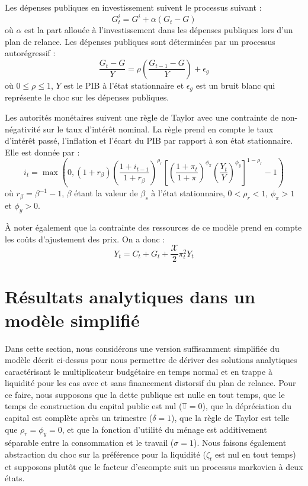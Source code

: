 \documentclass[12pt,letterpaper]{article}
\newcommand{\T}{\mathbb{T}}
\newcommand{\XX}{\mathcal{X}}
\begin{document}
Les dépenses publiques en investissement suivent le processus suivant :
\begin{equation}
G^i_t = G^i + \alpha(G_t - G) \tag{20}
\end{equation}
où $\alpha$ est la part allouée à l’investissement dans les dépenses publiques lors d’un plan de relance. Les dépenses publiques sont déterminées par un processus autorégressif :
\begin{equation}
\frac{G_t - G}{Y} = \rho\left(\frac{G_{t-1} - G}{Y}\right) + \epsilon_g \tag{21}
\end{equation}
où $0 \leq \rho \leq 1$, $Y$ est le PIB à l’état stationnaire et $\epsilon_g$ est un bruit blanc qui représente le choc sur les dépenses publiques.

Les autorités monétaires suivent une règle de Taylor avec une contrainte de non-négativité sur le taux d’intérêt nominal. La règle prend en compte le taux d’intérêt passé, l’inflation et l’écart du PIB par rapport à son état stationnaire. Elle est donnée par :
\begin{equation}
i_t = \max\left(0, (1+r_\beta)\left(\frac{1+i_{t-1}}{1+r_\beta}\right)^{\rho_r}\left[\left(\frac{1+\pi_t}{1+\pi}\right)^{\phi_\pi}\left(\frac{Y_t}{Y}\right)^{\phi_y}\right]^{1-\rho_r} - 1\right) \tag{22}
\end{equation}
où $r_\beta = \beta^{-1} - 1$, $\beta$ étant la valeur de $\beta_s$ à l’état stationnaire, $0 < \rho_r < 1$, $\phi_\pi > 1$ et $\phi_y > 0$.

À noter également que la contrainte des ressources de ce modèle prend en compte les coûts d’ajustement des prix. On a donc :
\begin{equation}
Y_t = C_t + G_t + \frac{\XX}{2}\pi_t^2 Y_t \tag{23}
\end{equation}

\section{Résultats analytiques dans un modèle simplifié}

Dans cette section, nous considérons une version suffisamment simplifiée du modèle décrit ci-dessus pour nous permettre de dériver des solutions analytiques caractérisant le multiplicateur budgétaire en temps normal et en trappe à liquidité pour les cas avec et sans financement distorsif du plan de relance. Pour ce faire, nous supposons que la dette publique est nulle en tout temps, que le temps de construction du capital public est nul ($\T = 0$), que la dépréciation du capital est complète après un trimestre ($\delta = 1$), que la règle de Taylor est telle que $\rho_r = \phi_y = 0$, et que la fonction d’utilité du ménage est additivement séparable entre la consommation et le travail ($\sigma = 1$). Nous faisons également abstraction du choc sur la préférence pour la liquidité ($\zeta_t$ est nul en tout temps) et supposons plutôt que le facteur d’escompte suit un processus markovien à deux états.
\end{document}
